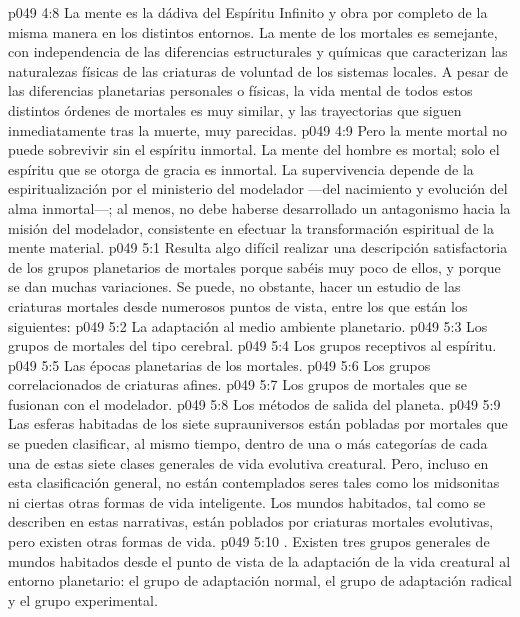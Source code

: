 \vs p049 4:8 \pc La mente es la dádiva del Espíritu Infinito y obra por completo de la misma manera en los distintos entornos. La mente de los mortales es semejante, con independencia de las diferencias estructurales y químicas que caracterizan las naturalezas físicas de las criaturas de voluntad de los sistemas locales. A pesar de las diferencias planetarias personales o físicas, la vida mental de todos estos distintos órdenes de mortales es muy similar, y las trayectorias que siguen inmediatamente tras la muerte, muy parecidas.
\vs p049 4:9 Pero la mente mortal no puede sobrevivir sin el espíritu inmortal. La mente del hombre es mortal; solo el espíritu que se otorga de gracia es inmortal. La supervivencia depende de la espiritualización por el ministerio del modelador ---del nacimiento y evolución del alma inmortal---; al menos, no debe haberse desarrollado un antagonismo hacia la misión del modelador, consistente en efectuar la transformación espiritual de la mente material.
\vs p049 5:1 Resulta algo difícil realizar una descripción satisfactoria de los grupos planetarios de mortales porque sabéis muy poco de ellos, y porque se dan muchas variaciones. Se puede, no obstante, hacer un estudio de las criaturas mortales desde numerosos puntos de vista, entre los que están los siguientes:
\vs p049 5:2 La adaptación al medio ambiente planetario.
\vs p049 5:3 Los grupos de mortales del tipo cerebral.
\vs p049 5:4 Los grupos receptivos al espíritu.
\vs p049 5:5 Las épocas planetarias de los mortales.
\vs p049 5:6 Los grupos correlacionados de criaturas afines.
\vs p049 5:7 Los grupos de mortales que se fusionan con el modelador.
\vs p049 5:8 Los métodos de salida del planeta.
\vs p049 5:9 \pc Las esferas habitadas de los siete suprauniversos están pobladas por mortales que se pueden clasificar, al mismo tiempo, dentro de una o más categorías de cada una de estas siete clases generales de vida evolutiva creatural. Pero, incluso en esta clasificación general, no están contemplados seres tales como los midsonitas ni ciertas otras formas de vida inteligente. Los mundos habitados, tal como se describen en estas narrativas, están poblados por criaturas mortales evolutivas, pero existen otras formas de vida.
\vs p049 5:10 . Existen tres grupos generales de mundos habitados desde el punto de vista de la adaptación de la vida creatural al entorno planetario: el grupo de adaptación normal, el grupo de adaptación radical y el grupo experimental.
